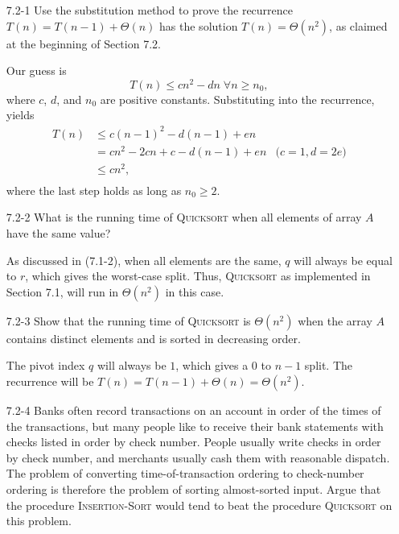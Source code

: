\documentclass{report}
\makeatletter
\renewenvironment{framed}{%
 \def\FrameCommand##1{\hskip\@totalleftmargin
 \fboxsep=\FrameSep\fbox{##1}}%
 \MakeFramed {\advance\hsize-\width
   \@totalleftmargin\z@ \linewidth\hsize
   \@setminipage}}%
 {\par\unskip\endMakeFramed}
\DeclareMathOperator{\Forall}{\forall}
\makeatother
\begin{document}
\begin{enumerate}

\item[7.2{-}1]{Use the substitution method to prove the recurrence
$T(n) = T(n - 1) + \Theta(n)$ has the solution $T(n) = \Theta(n^2)$, as claimed
at the beginning of Section 7.2.}

\begin{framed}
Our guess is
\[
  T(n) \le cn^2 - dn\;\Forall n \ge n_0,
\]
where $c$, $d$, and $n_0$ are positive constants. Substituting into the
recurrence, yields
\begin{equation*}
\begin{aligned}
  T(n) &\le c(n - 1)^2 - d(n - 1) + en\\
       &= cn^2 - 2cn + c -d(n - 1) + en & \text{($c = 1, d = 2e$)}\\
       &\le cn^2,\\
\end{aligned}
\end{equation*}
where the last step holds as long as $n_0 \ge 2$.
\end{framed}

\item[7.2{-}2]{What is the running time of \textsc{Quicksort} when all elements
of array $A$ have the same value?}

\begin{framed}
As discussed in (7.1-2), when all elements are the same, $q$ will always be
equal to $r$, which gives the worst-case split. Thus, \textsc{Quicksort} as
implemented in Section 7.1, will run in $\Theta(n^2)$ in this case.
\end{framed}

\item[7.2{-}3]{Show that the running time of \textsc{Quicksort} is $\Theta(n^2)$
when the array $A$ contains distinct elements and is sorted in decreasing
order.}

\begin{framed}
The pivot index $q$ will always be $1$, which gives a $0$ to $n - 1$ split.
The recurrence will be $T(n) = T(n - 1) + \Theta(n) = \Theta(n^2)$.
\end{framed}

\item[7.2{-}4]{Banks often record transactions on an account in order of the
times of the transactions, but many people like to receive their bank statements
with checks listed in order by check number. People usually write checks in
order by check number, and merchants usually cash them with reasonable dispatch.
The problem of converting time-of-transaction ordering to check-number ordering
is therefore the problem of sorting almost-sorted input. Argue that the
procedure \textsc{Insertion-Sort} would tend to beat the procedure
\textsc{Quicksort} on this problem.}


\end{enumerate}
\end{document}
